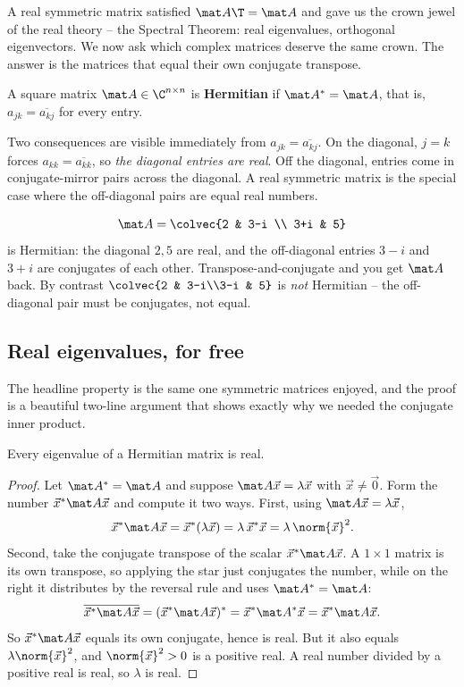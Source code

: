 A real symmetric matrix satisfied $\mat A\T=\mat A$ and gave us the crown jewel of
the real theory -- the Spectral Theorem: real eigenvalues, orthogonal
eigenvectors. We now ask which complex matrices deserve the same crown. The answer
is the matrices that equal their own conjugate transpose.

\begin{definition}\label{ch32:hermdef}
A square matrix $\mat A\in\C^{n\times n}$ is \textbf{Hermitian} if
$\mat A^{*} = \mat A$, that is, $a_{jk} = \overline{a_{kj}}$ for every entry.
\end{definition}

Two consequences are visible immediately from $a_{jk}=\overline{a_{kj}}$. On the
diagonal, $j=k$ forces $a_{kk}=\overline{a_{kk}}$, so \emph{the diagonal entries
are real}. Off the diagonal, entries come in conjugate-mirror pairs across the
diagonal. A real symmetric matrix is the special case where the off-diagonal pairs
are equal real numbers.

\begin{example}\label{ch32:hermex}
\[
  \mat A = \colvec{2 & 3-i \\ 3+i & 5}
\]
is Hermitian: the diagonal $2,5$ are real, and the off-diagonal entries $3-i$ and
$3+i$ are conjugates of each other. Transpose-and-conjugate and you get $\mat A$
back. By contrast $\colvec{2 & 3-i\\3-i & 5}$ is \emph{not} Hermitian -- the
off-diagonal pair must be conjugates, not equal.
\end{example}

\subsection{Real eigenvalues, for free}

The headline property is the same one symmetric matrices enjoyed, and the proof is
a beautiful two-line argument that shows exactly why we needed the conjugate inner
product.

\begin{theorem}\label{ch32:realeig}
Every eigenvalue of a Hermitian matrix is real.
\end{theorem}

\begin{proof}
Let $\mat A^{*}=\mat A$ and suppose $\mat A\vec x = \lambda\vec x$ with
$\vec x\ne\vec 0$. Form the number $\vec x^{*}\mat A\vec x$ and compute it two
ways. First, using $\mat A\vec x=\lambda\vec x$,
\[
  \vec x^{*}\mat A\vec x = \vec x^{*}(\lambda\vec x)
  = \lambda\,\vec x^{*}\vec x = \lambda\,\norm{\vec x}^2.
\]
Second, take the conjugate transpose of the scalar $\vec x^{*}\mat A\vec x$. A
$1\times 1$ matrix is its own transpose, so applying the star just conjugates the
number, while on the right it distributes by the reversal rule and uses
$\mat A^{*}=\mat A$:
\[
  \overline{\vec x^{*}\mat A\vec x} = (\vec x^{*}\mat A\vec x)^{*}
  = \vec x^{*}\mat A^{*}\vec x = \vec x^{*}\mat A\vec x.
\]
So $\vec x^{*}\mat A\vec x$ equals its own conjugate, hence is real. But it also
equals $\lambda\norm{\vec x}^2$, and $\norm{\vec x}^2>0$ is a positive real. A real
number divided by a positive real is real, so $\lambda$ is real.
\end{proof}

